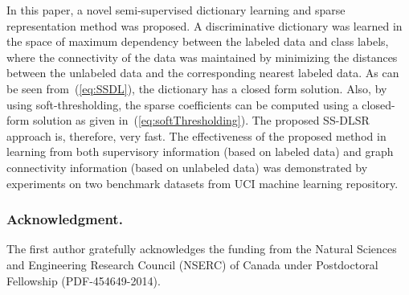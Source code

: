 \documentclass{llncs}
\begin{document}
In this paper, a novel semi-supervised dictionary learning and sparse representation method was proposed. A discriminative dictionary was learned in the space of maximum dependency between the labeled data and class labels, where the connectivity of the data was maintained by minimizing the distances between the unlabeled data and the corresponding nearest labeled data. As can be seen from~(\ref{eq:SSDL}), the dictionary has a closed form solution. Also, by using soft-thresholding, the sparse coefficients can be computed using a closed-form solution as given in~(\ref{eq:softThresholding}). The proposed SS-DLSR approach is, therefore, very fast. The effectiveness of the proposed method in learning from both supervisory information (based on labeled data) and graph connectivity information (based on unlabeled data) was demonstrated by experiments on two benchmark datasets from UCI machine learning repository.

\subsubsection{Acknowledgment.}

The first author gratefully acknowledges the funding from the Natural Sciences and Engineering Research Council (NSERC) of Canada under Postdoctoral Fellowship (PDF-454649-2014).




\end{document}
